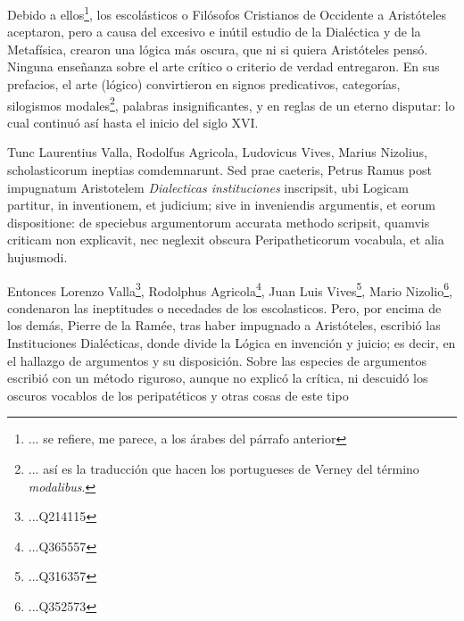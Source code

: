 \documentclass{article}
\begin{document}
\begin{paracol}{2}
\begin{nthcolumn*}{0}
\end{nthcolumn*}
\vspace{0.5cm}
\begin{nthcolumn}{1} %
  Debido a ellos\footnote{... se refiere, me parece, a los árabes del párrafo anterior}, los escolásticos o Filósofos Cristianos de Occidente a Aristóteles aceptaron, pero a causa del excesivo e inútil estudio de la Dialéctica y de la Metafísica, crearon una lógica más oscura, que ni si quiera Aristóteles pensó. Ninguna enseñanza sobre el arte crítico o criterio de verdad entregaron. En sus prefacios, el arte (lógico) convirtieron en signos predicativos, categorías, silogismos modales\footnote{... así es la traducción que hacen los portugueses de Verney del término \emph{modalibus}.}, palabras insignificantes, y en reglas de un eterno disputar: lo cual continuó así hasta el inicio del siglo XVI.
\end{nthcolumn}
\vspace{0.5cm}
\begin{nthcolumn*}{0} %
  Tunc Laurentius Valla, Rodolfus Agricola, Ludovicus Vives, Marius Nizolius, scholasticorum ineptias comdemnarunt. Sed prae caeteris, Petrus Ramus post impugnatum Aristotelem \emph{Dialecticas instituciones} inscripsit, ubi Logicam partitur, in inventionem, et judicium; sive in inveniendis argumentis, et eorum dispositione: de speciebus argumentorum accurata methodo scripsit, quamvis criticam non explicavit, nec neglexit obscura Peripatheticorum vocabula, et alia hujusmodi.
\end{nthcolumn*}
\vspace{0.5cm}
\begin{nthcolumn}{1} %
  Entonces Lorenzo Valla\footnote{...Q214115}, Rodolphus Agricola\footnote{...Q365557}, Juan Luis Vives\footnote{...Q316357}, Mario Nizolio\footnote{...Q352573}, condenaron las ineptitudes o necedades de los escolasticos. Pero, por encima de los demás, Pierre de la Ramée, tras haber impugnado a Aristóteles, escribió las Instituciones Dialécticas, donde divide la Lógica en invención y juicio; es decir, en el hallazgo de argumentos y su disposición. Sobre las especies de argumentos escribió con un método riguroso, aunque no explicó la crítica, ni descuidó los oscuros vocablos de los peripatéticos y otras cosas de este tipo
\end{nthcolumn}
\vspace{0.5cm}
\end{paracol}
\end{document}
